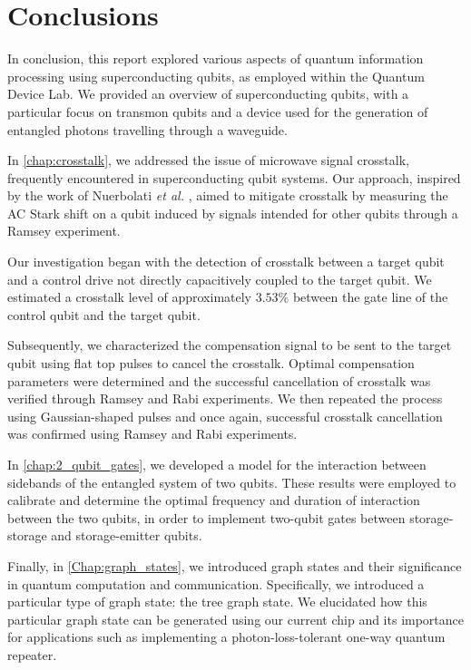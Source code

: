 \chapter*{Conclusions}
\label{chap:conclusions}
\thispagestyle{fancy}

In conclusion, this report explored various aspects of quantum information processing using superconducting qubits, as employed within the Quantum Device Lab. 
We provided an overview of superconducting qubits, with a particular focus on transmon qubits and a device used for the generation of entangled photons travelling through a waveguide.

In \cref{chap:crosstalk}, we addressed the issue of microwave signal crosstalk, frequently encountered in superconducting qubit systems.
Our approach, inspired by the work of Nuerbolati \emph{et al.} \cite{crosstalk}, aimed to mitigate crosstalk by measuring the AC Stark shift on a qubit induced by signals intended for other qubits through a Ramsey experiment.

Our investigation began with the detection of crosstalk between a target qubit and a control drive not directly capacitively coupled to the target qubit.
We estimated a crosstalk level of approximately $3.53\%$ between the gate line of the control qubit and the target qubit.

Subsequently, we characterized the compensation signal to be sent to the target qubit using flat top pulses to cancel the crosstalk.
Optimal compensation parameters were determined and the successful cancellation of crosstalk was verified through Ramsey and Rabi experiments.
We then repeated the process using Gaussian-shaped pulses and once again, successful crosstalk cancellation was confirmed using Ramsey and Rabi experiments.

In \cref{chap:2_qubit_gates}, we developed a model for the interaction between sidebands of the entangled system of two qubits. 
These results were employed to calibrate and determine the optimal frequency and duration of interaction between the two qubits, in order to implement two-qubit gates between storage-storage and storage-emitter qubits.

Finally, in \cref{Chap:graph_states}, we introduced graph states and their significance in quantum computation and communication.
Specifically, we introduced a particular type of graph state: the tree graph state.
We elucidated how this particular graph state can be generated using our current chip and its importance for applications such as implementing a photon-loss-tolerant one-way quantum repeater.
